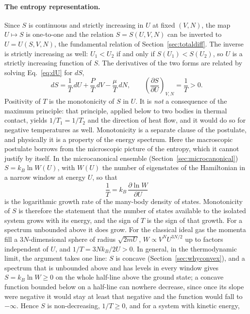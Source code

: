 \documentclass[10pt,a4paper]{article}
\theoremstyle{remark}
\begin{document}
\paragraph{The entropy representation.} Since $S$ is continuous and strictly
increasing in $U$ at fixed $(V,N)$, the map $U\mapsto S$ is one-to-one and the
relation $S=S(U,V,N)$ can be inverted to $U=U(S,V,N)$, the fundamental
relation of Section~\ref{sec:totaldiff}. The inverse is strictly increasing as
well: $U_1<U_2$ if and only if $S(U_1)<S(U_2)$, so $U$ is a strictly increasing
function of $S$. The derivatives of the
two forms are related by solving Eq.~\eqref{eq:dU} for $dS$,
\begin{equation}\label{eq:dS}
  dS=\frac{1}{T}\,dU+\frac{P}{T}\,dV-\frac{\mu}{T}\,dN ,
  \qquad
  \left(\frac{\partial S}{\partial U}\right)_{V,N}=\frac{1}{T}>0 .
\end{equation}
Positivity of $T$ is the monotonicity of $S$ in $U$.
It is \emph{not} a consequence of the maximum principle:
that principle, applied below to two bodies in thermal contact,
yields $1/T_1=1/T_2$ and the direction of heat flow, and it would do
so for negative temperatures as well. Monotonicity is a separate clause of the
postulate, and physically it is a property of the energy spectrum. Here
the macroscopic postulate borrows from the microscopic picture of the
entropy, which it cannot justify by itself. In the microcanonical ensemble
(Section~\ref{sec:microcanonical}) $S=k_B\ln W(U)$, with $W(U)$ the number of
eigenstates of the Hamiltonian in a narrow window at energy $U$, so that
\[
  \frac{1}{T}=k_B\,\frac{\partial\ln W}{\partial U}
\]
is the logarithmic growth rate of the many-body density of states.
Monotonicity of $S$ is therefore the statement that the number of states
available to the isolated system grows with its energy, and the sign of $T$ is the sign
of that growth. For a spectrum unbounded above it does grow. For the classical
ideal gas the momenta fill a $3N$-dimensional sphere of radius $\sqrt{2mU}$,
$W\propto V^{N}U^{3N/2}$ up to factors independent of $U$, and
$1/T=3Nk_B/2U>0$. In general, in the thermodynamic limit, the argument takes
one line: $S$ is concave (Section~\ref{sec:whyconvex}), and a spectrum that is
unbounded above and has levels in every window gives $S=k_B\ln W\geq0$ on the
whole half-line above the ground state; a concave function bounded below on a
half-line can nowhere decrease, since once its slope were negative it would
stay at least that negative and the function would fall to $-\infty$. Hence
$S$ is non-decreasing, $1/T\geq0$, and for a system with kinetic energy,
\end{document}
